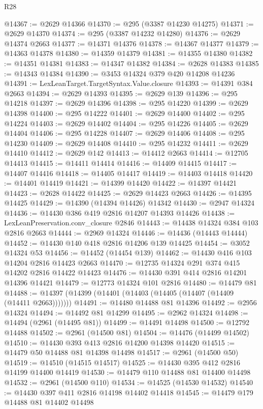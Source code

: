 \begin{lexlean}{R28}
\begin{coremodule}
@14367 := @2629 @14366
@14370 := @295 (@3387 @14230 @14275)
@14371 := @2629 @14370
@14374 := @295 (@3387 @14232 @14280)
@14376 := @2629 @14374 @2663
@14377 := @14371 @14376
@14378 := @14367 @14377
@14379 := @14363 @14378
@14380 := @14359 @14379
@14381 := @14355 @14380
@14382 := @14351 @14381
@14383 := @14347 @14382
@14384 := @2628 @14383
@14385 := @14343 @14384
@14390 := @3453 @14324 @379 @420 @14208 @14236
@14391 := LexLeanTarget.TargetSyntax.Value.closure
@14393 := @14391 @384 @2663
@14394 := @2629 @14393
@14395 := @2629 @139
@14396 := @295 @14218
@14397 := @2629 @14396
@14398 := @295 @14220
@14399 := @2629 @14398
@14400 := @295 @14222
@14401 := @2629 @14400
@14402 := @295 @14224
@14403 := @2629 @14402
@14404 := @295 @14226
@14405 := @2629 @14404
@14406 := @295 @14228
@14407 := @2629 @14406
@14408 := @295 @14230
@14409 := @2629 @14408
@14410 := @295 @14232
@14411 := @2629 @14410
@14412 := @2629 @142
@14413 := @14412 @2663
@14414 := @12705 @14413
@14415 := @14411 @14414
@14416 := @14409 @14415
@14417 := @14407 @14416
@14418 := @14405 @14417
@14419 := @14403 @14418
@14420 := @14401 @14419
@14421 := @14399 @14420
@14422 := @14397 @14421
@14423 := @2628 @14422
@14425 := @2629 @14423 @2663
@14426 := @14395 @14425
@14429 := @14390 (@14394 @14426) @14342
@14430 := @2947 @14324
@14436 := @14430 @386 @419 @2816 @14207 @14393 @14426
@14438 := LexLeanPreservation.conv_closure @2846
@14443 := @14438 @14324 @384 @103 @2816 @2663
@14444 := @2969 @14324
@14446 := @14436 (@14443 @14444)
@14452 := @14430 @140 @418 @2816 @14206 @139 @14425
@14454 := @3052 @14324 @53
@14456 := @14452 (@14454 @139)
@14462 := @14430 @416 @103 @14204 @2816 @14423 @2663
@14470 := @12735 @14324 @291 @374 @415 @14202 @2816 @14422 @14423
@14476 := @14430 @391 @414 @2816 @14201 @14396 @14421
@14479 := @12773 @14324 @101 @2816
@14480 := @14479 @81
@14488 := @14397 (@14399 (@14401 (@14403 (@14405 (@14407 (@14409 (@14411 @2663)))))))
@14491 := @14480 @14488 @81 @14396
@14492 := @2956 @14324
@14494 := @14492 @81 @14299
@14495 := @2962 @14324
@14498 := @14494 (@2961 (@14495 @81))
@14499 := @14491 @14498
@14500 := @12792 @14488
@14502 := @2961 (@14500 @81)
@14504 := @14476 (@14499 @14502)
@14510 := @14430 @393 @413 @2816 @14200 @14398 @14420
@14515 := @14479 @50 @14488 @81 @14398 @14498
@14517 := @2961 (@14500 @50)
@14519 := @14510 (@14515 @14517)
@14525 := @14430 @395 @412 @2816 @14199 @14400 @14419
@14530 := @14479 @110 @14488 @81 @14400 @14498
@14532 := @2961 (@14500 @110)
@14534 := @14525 (@14530 @14532)
@14540 := @14430 @397 @411 @2816 @14198 @14402 @14418
@14545 := @14479 @179 @14488 @81 @14402 @14498

\end{coremodule}
\end{lexlean}
